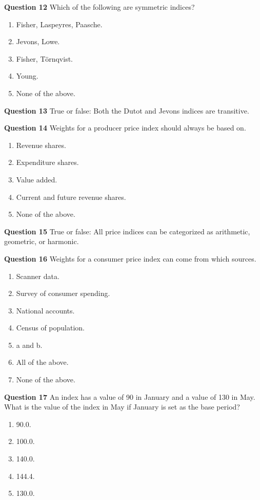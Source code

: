 \documentclass[]{article}
\begin{document}
\textbf{Question 12} Which of the following are symmetric indices?

\begin{enumerate}
\def\labelenumi{\alph{enumi})}
\item
  Fisher, Laspeyres, Paasche.
\item
  Jevons, Lowe.
\item
  Fisher, Törnqvist.
\item
  Young.
\item
  None of the above.
\end{enumerate}

\textbf{Question 13} True or false: Both the Dutot and Jevons indices are transitive.

\textbf{Question 14} Weights for a producer price index should always be based on.

\begin{enumerate}
\def\labelenumi{\alph{enumi})}
\item
  Revenue shares.
\item
  Expenditure shares.
\item
  Value added.
\item
  Current and future revenue shares.
\item
  None of the above.
\end{enumerate}

\textbf{Question 15} True or false: All price indices can be categorized as arithmetic, geometric, or harmonic.

\textbf{Question 16} Weights for a consumer price index can come from which sources.

\begin{enumerate}
\def\labelenumi{\alph{enumi})}
\item
  Scanner data.
\item
  Survey of consumer spending.
\item
  National accounts.
\item
  Census of population.
\item
  a and b.
\item
  All of the above.
\item
  None of the above.
\end{enumerate}

\textbf{Question 17} An index has a value of 90 in January and a value of 130 in May. What is the value of the index in May if January is set as the base period?

\begin{enumerate}
\def\labelenumi{\alph{enumi})}
\item
  90.0.
\item
  100.0.
\item
  140.0.
\item
  144.4.
\item
  130.0.
\end{enumerate}
\end{document}

